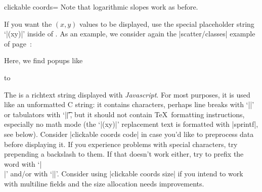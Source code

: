 \begin{pgfplotskey}{clickable coords=}
	Note that logarithmic slopes work as before.
	
	If you want the $(x,y)$ values to be displayed, use the special placeholder string `|(xy)|' inside of . As an example, we consider again the |scatter/classes| example of page~\pageref{pgfplots:scatterclasses}:

\begin{codeexample}[]
\end{codeexample}
	\noindent Here, we find popups like

	\noindent\hbox to %

	The  is a richtext string displayed with \emph{Javascript}. For most purposes, it is used like an unformatted C string: it contains characters, perhaps line breaks with `|\n|' or tabulators with `|\t|', but it should not contain \TeX\ formatting instructions, especially no math mode (the `|(xy)|' replacement text is formatted with |sprintf|, see below). Consider |clickable coords code| in case you'd like to preprocess data before displaying it. If you experience problems with special characters, try prepending a backslash to them. If that doesn't work either, try to prefix the word with `|\\|' and/or with `|\string|'. Consider using |clickable coords size| if you intend to work with multiline fields and the size allocation needs improvements.


\end{pgfplotskey}
